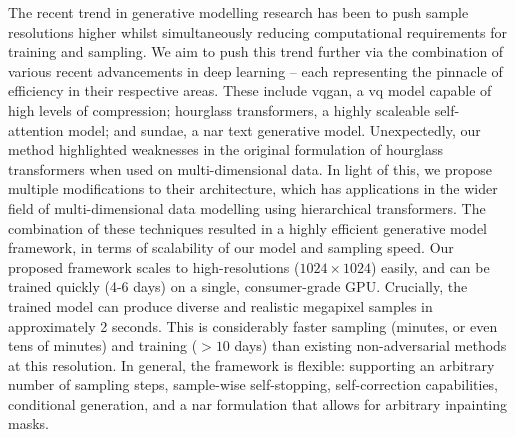 The recent trend in generative modelling research has been to push sample
resolutions higher whilst simultaneously reducing computational requirements for
training and sampling. We aim to push this trend further via the combination of
various recent advancements in deep learning -- each representing the pinnacle
of efficiency in their respective areas. These include \acrfull{vqgan}, a
\gls{vq} model capable of high levels of compression; hourglass transformers, a
highly scaleable self-attention model; and \acrfull{sundae}, a \acrfull{nar}
text generative model. Unexpectedly, our method highlighted weaknesses in the
original formulation of hourglass transformers when used on multi-dimensional
data. In light of this, we propose multiple modifications to their architecture,
which has applications in the wider field of multi-dimensional data modelling
using hierarchical transformers. The combination of these techniques resulted in
a highly efficient generative model framework, in terms of scalability of our
model and sampling speed. Our proposed framework scales to high-resolutions
($1024 \times 1024$) easily, and can be trained quickly (4-6 days) on a single,
consumer-grade GPU. Crucially, the trained model can produce diverse and
realistic megapixel samples in approximately 2 seconds. This is considerably
faster sampling (minutes, or even tens of minutes) and training ($>10$ days)
than existing non-adversarial methods at this resolution. In general, the
framework is flexible: supporting an arbitrary number of sampling steps,
sample-wise self-stopping, self-correction capabilities, conditional generation,
and a \acrshort{nar} formulation that allows for arbitrary inpainting masks.
